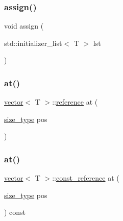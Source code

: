 \mbox{\label{classvector_a4c8ca8b2010c5c196271319f425633f5}} 
\subsubsection{\texorpdfstring{assign()}{assign()}\hspace{0.1cm}{\footnotesize\ttfamily [3/3]}}
{\footnotesize\ttfamily void assign (\begin{DoxyParamCaption}\item[{std\+::initializer\+\_\+list$<$ T $>$}]{lst }\end{DoxyParamCaption})}

\mbox{\label{classvector_a3b0051d5e19cb635377d23a3d33a9850}} 
\subsubsection{\texorpdfstring{at()}{at()}\hspace{0.1cm}{\footnotesize\ttfamily [1/2]}}
{\footnotesize\ttfamily \mbox{\hyperlink{classvector}{vector}}$<$ T $>$\+::\mbox{\hyperlink{classvector_a9b1a63f171d76a7a3995b6858e99f2ea}{reference}} at (\begin{DoxyParamCaption}\item[{\mbox{\hyperlink{classvector_ada51e68d31936547d3729c82daf6b7c6}{size\+\_\+type}}}]{pos }\end{DoxyParamCaption})}

\mbox{\label{classvector_a17ce3a171874bcf34bc18ddd087aee05}} 
\subsubsection{\texorpdfstring{at()}{at()}\hspace{0.1cm}{\footnotesize\ttfamily [2/2]}}
{\footnotesize\ttfamily \mbox{\hyperlink{classvector}{vector}}$<$ T $>$\+::\mbox{\hyperlink{classvector_af9ba3e25df088c62f7d535b91672cda9}{const\+\_\+reference}} at (\begin{DoxyParamCaption}\item[{\mbox{\hyperlink{classvector_ada51e68d31936547d3729c82daf6b7c6}{size\+\_\+type}}}]{pos }\end{DoxyParamCaption}) const}

